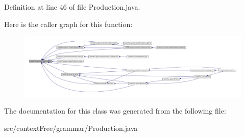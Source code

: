 Definition at line 46 of file Production.\-java.



Here is the caller graph for this function\-:\nopagebreak
\begin{figure}[H]
\begin{center}
\leavevmode
\includegraphics[width=350pt]{classcontext_free_1_1grammar_1_1_production_a6b42819c4b8af1aa759edf3ad5978f67_icgraph}
\end{center}
\end{figure}




The documentation for this class was generated from the following file\-:\begin{DoxyCompactItemize}
\item 
src/context\-Free/grammar/Production.\-java\end{DoxyCompactItemize}
